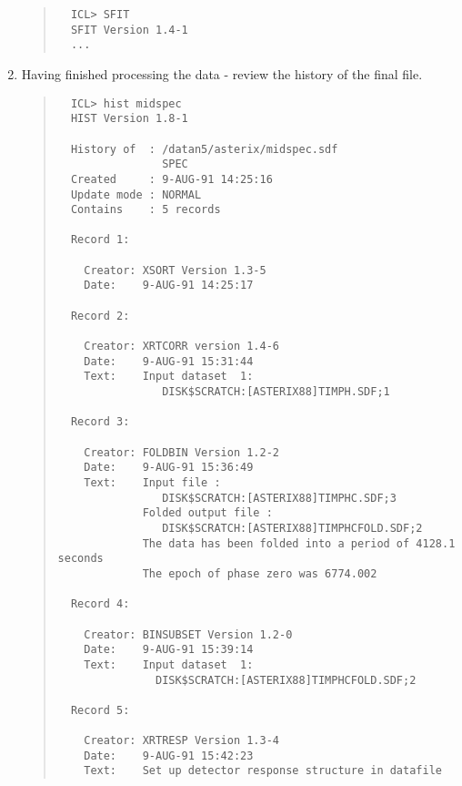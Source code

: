 \documentclass{book}
\renewcommand{\_}{{\tt\char'137}}     %
\begin{document}
\begin{enumerate}
\begin{quote}
\begin{verbatim}
  ICL> SFIT
  SFIT Version 1.4-1
  ...
  \end{verbatim}\end{quote}
\item Having finished processing the data - review the history
of the final file.
 
\begin{quote}\begin{verbatim}
  ICL> hist midspec
  HIST Version 1.8-1
 
  History of  : /datan5/asterix/midspec.sdf
                SPEC
  Created     : 9-AUG-91 14:25:16
  Update mode : NORMAL
  Contains    : 5 records
 
  Record 1:
 
    Creator: XSORT Version 1.3-5
    Date:    9-AUG-91 14:25:17
 
  Record 2:
 
    Creator: XRTCORR version 1.4-6
    Date:    9-AUG-91 15:31:44
    Text:    Input dataset  1:
                DISK$SCRATCH:[ASTERIX88]TIMPH.SDF;1
 
  Record 3:
 
    Creator: FOLDBIN Version 1.2-2
    Date:    9-AUG-91 15:36:49
    Text:    Input file :
                DISK$SCRATCH:[ASTERIX88]TIMPHC.SDF;3
             Folded output file :
                DISK$SCRATCH:[ASTERIX88]TIMPHCFOLD.SDF;2
             The data has been folded into a period of 4128.1 seconds
             The epoch of phase zero was 6774.002
 
  Record 4:
 
    Creator: BINSUBSET Version 1.2-0
    Date:    9-AUG-91 15:39:14
    Text:    Input dataset  1:
               DISK$SCRATCH:[ASTERIX88]TIMPHCFOLD.SDF;2
 
  Record 5:
 
    Creator: XRTRESP Version 1.3-4
    Date:    9-AUG-91 15:42:23
    Text:    Set up detector response structure in datafile
  \end{verbatim}\end{quote}
\end{enumerate}
\end{document}
